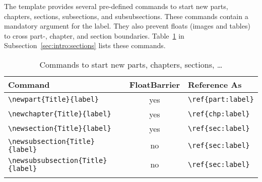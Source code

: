 
The template provides several pre-defined commands to start new parts, chapters, sections, subsections, and subsubsections. These commands contain a mandatory argument for the label. They also prevent floats (images and tables) to cross part-, chapter, and section boundaries. Table~\ref{tab:intro:sections:commands} in Subsection~\ref{sec:intro:sections} lists these commands.

\begin{longtable}{l|c|l}
  \textbf{Command} & \textbf{FloatBarrier} & \textbf{Reference As} \\\hline
  \verb|\newpart{Title}{label}| & yes & \verb|\ref{part:label}| \\
  \verb|\newchapter{Title}{label}| & yes & \verb|\ref{chp:label}| \\
  \verb|\newsection{Title}{label}| & yes & \verb|\ref{sec:label}| \\
  \verb|\newsubsection{Title}{label}| & no & \verb|\ref{sec:label}| \\
  \verb|\newsubsubsection{Title}{label}| & no & \verb|\ref{sec:label}| \\
  \caption{Commands to start new parts, chapters, sections, \dots}
  \label{tab:intro:sections:commands}
\end{longtable}






